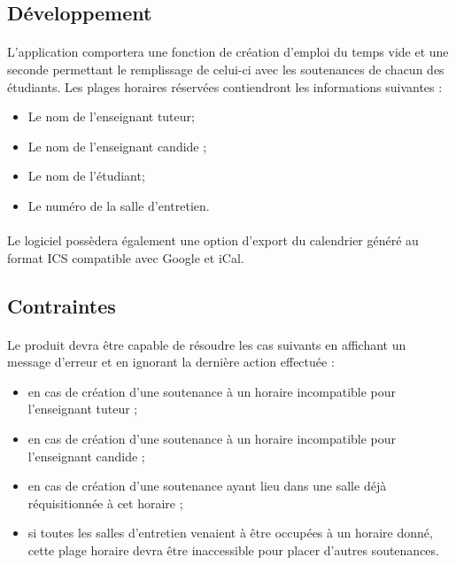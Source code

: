\documentclass[a4paper,10pt]{report}
\begin{document}
      \subsection{Développement}
	
	\paragraph{}
	L’application comportera une fonction de création d’emploi du temps vide et une seconde permettant le remplissage de celui-ci avec les soutenances de chacun des étudiants.
	Les plages horaires réservées contiendront les informations suivantes :
	\renewcommand\labelitemi{\textbullet}
	\begin{itemize}
	  \item Le nom de l’enseignant tuteur;
	  \item Le nom de l’enseignant candide ;
	  \item Le nom de l’étudiant;
	  \item Le numéro de la salle d’entretien.
	\end{itemize}
	
	\paragraph{}
	Le logiciel possèdera également une option d’export du calendrier généré au format ICS compatible avec Google et iCal.
	
      \subsection{Contraintes}
	\paragraph{}

	Le produit devra être capable de résoudre les cas suivants en affichant un message d’erreur et en ignorant la dernière action effectuée :
	\newline
	\renewcommand\labelitemi{\textbullet}
	\begin{itemize}
	  \item en cas de création d'une soutenance à un horaire incompatible pour l'enseignant tuteur ;
	  \item en cas de création d'une soutenance à un horaire incompatible pour l'enseignant candide ;
	  \item en cas de création d'une soutenance ayant lieu dans une salle déjà réquisitionnée à cet horaire ;
	  \item si toutes les salles d’entretien venaient à être occupées à un horaire donné, cette plage horaire devra être inaccessible pour placer d’autres soutenances.
	\end{itemize}
  
\end{document}
